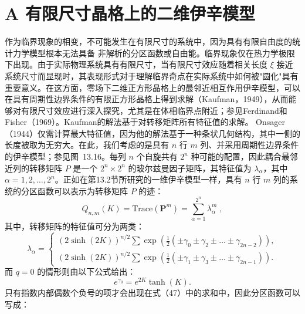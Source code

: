 \section{A 有限尺寸晶格上的二维伊辛模型}\label{a-ux6709ux9650ux5c3aux5bf8ux6676ux683cux4e0aux7684ux4e8cux7ef4ux4f0aux8f9bux6a21ux578b}
作为临界现象的相变，不可能发生在有限尺寸的系统中，因为具有有限自由度的统计力学模型根本无法具备
非解析的分区函数或自由能。临界现象仅在热力学极限下出现。由于实际物理系统具有有限尺寸，当有限尺寸效应随着相关长度 \(\xi\) 接近系统尺寸而显现时，其表现形式对于理解临界奇点在实际系统中如何被"圆化"具有重要意义。在这方面，零场下二维正方形晶格上的最邻近相互作用伊辛模型，可以在具有周期性边界条件的有限正方形晶格上得到求解（Kaufman，1949），从而能够对有限尺寸效应进行深入探究，尤其是在体相临界点附近；参见Ferdinand和Fisher（1969）。Kaufman的解法基于对转移矩阵所有特征值的求解。
Onsager（1944）仅需计算最大特征值，因为他的解法基于一种条状几何结构，其中一侧的长度被取为无穷大。在此，我们考虑的是具有 \(n\) 行 \(m\) 列、并采用周期性边界条件的伊辛模型；参见图~13.16。每列 \(n\) 个自旋共有 \(2^n\) 种可能的配置，因此耦合最邻近列的转移矩阵 \(P\) 是一个 \(2^n \times 2^n\) 的玻尔兹曼因子矩阵，其特征值为 \(\lambda_{\alpha}\)，其中 \(\alpha = 1, 2, \ldots, 2^n\)。正如在第13.2节所研究的一维伊辛模型一样，具有 \(n\) 行 \(m\) 列的系统的分区函数可以表示为转移矩阵 \(P\) 的迹：
\begin{equation}\tag{13.4.1}\label{eq:13.4.1}
Q _ { n , m } ( K ) = \mathrm { T r a c e } ( \pmb { P } ^{m} ) = \sum _ { \alpha = 1 } ^{2 ^ { n} } \lambda _ { \alpha } ^{m} \; ,
\end{equation}
其中，转移矩阵的特征值可分为两类：
\begin{equation}\tag{13.4.2}\label{eq:13.4.2}
\lambda _ { \alpha } = \left\{ \begin{array}{ll} { \left( 2 \sinh ( 2 K ) \right) ^{n / 2} \sum \exp \left( \frac { 1 } { 2 } \left( \pm \gamma _ { 0 } \pm \gamma _ { 2 } \pm \ldots \pm \gamma _ { 2 n - 2 } \right) \right) , } \\{ \left( 2 \sinh ( 2 K ) \right) ^{n / 2} \sum \exp \left( \frac { 1 } { 2 } \left( \pm \gamma _ { 1 } \pm \gamma _ { 3 } \pm \ldots \pm \gamma _ { 2 n - 1 } \right) \right) . } \end{array} \right.
\end{equation}
而 \(q=0\) 的情形则由以下公式给出：
\begin{equation}\tag{13.4.3}\label{eq:13.4.3}
e ^{\gamma _ { 0} } = e ^{2 K} \operatorname { t a n h } ( K ) .
\end{equation}
只有指数内部偶数个负号的项才会出现在式（47）中的求和中，因此分区函数可以写成：
